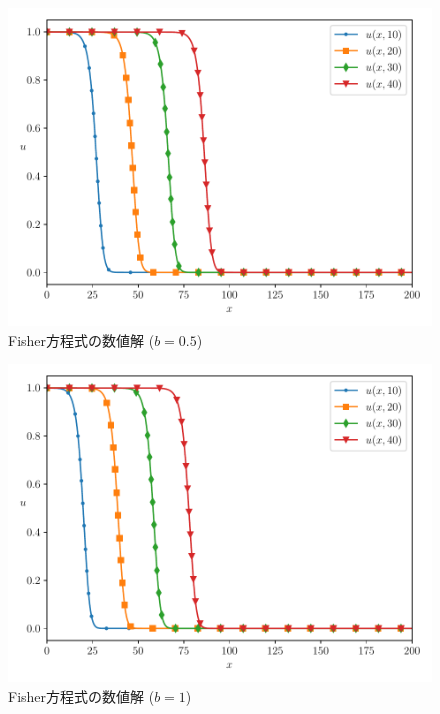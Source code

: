 \documentclass[a4j, titlepage]{jsarticle}
\numberwithin{equation}{section}
\begin{document}
            \begin{figure}[h]
                \centering
                \includegraphics[width=0.8\hsize]{kadai2/50.pdf}
                \caption{Fisher方程式の数値解 ($b = 0.5$)}
                \label{fig:fisher50}
            \end{figure}
            \begin{figure}[h]
                \centering
                \includegraphics[width=0.8\hsize]{kadai2/100.pdf}
                \caption{Fisher方程式の数値解 ($b = 1$)}
                \label{fig:fisher100}
            \end{figure}
\end{document}

